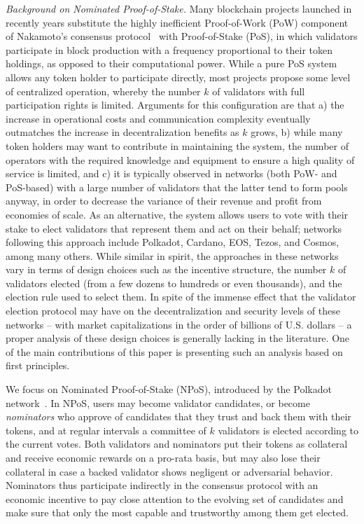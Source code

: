 \emph{Background on Nominated Proof-of-Stake.}
Many blockchain projects launched in recently years substitute the highly inefficient Proof-of-Work (PoW) component of Nakamoto's consensus protocol~\cite{nakamoto2019bitcoin} with Proof-of-Stake (PoS), in which validators participate in block production with a frequency proportional to their token holdings, as opposed to their computational power. 
While a pure PoS system allows any token holder to participate directly, most projects propose some level of centralized operation, whereby the number $k$ of validators with full participation rights is limited. 
Arguments for this configuration are that a) the increase in operational costs and communication complexity eventually outmatches the increase in decentralization benefits as $k$ grows, b) while many token holders may want to contribute in maintaining the system, the number of operators with the required knowledge and equipment to ensure a high quality of service is limited, and c) it is typically observed in networks (both PoW- and PoS-based) with a large number of validators that the latter tend to form pools anyway, in order to decrease the variance of their revenue and profit from economies of scale. 
As an alternative, the system allows users to vote with their stake to elect validators that represent them and act on their behalf; networks following this approach include Polkadot, Cardano, EOS, Tezos, and Cosmos, among many others. 
%
While similar in spirit, the approaches in these networks vary in terms of design choices such as the incentive structure, the number $k$ of validators elected (from a few dozens to hundreds or even thousands), and the election rule used to select them. 
In spite of the immense effect that the validator election protocol may have on the decentralization and security levels of these networks -- with market capitalizations in the order of billions of U.S. dollars -- a proper analysis of these design choices is generally lacking in the literature. 
One of the main contributions of this paper is presenting such an analysis based on first principles.

We focus on Nominated Proof-of-Stake (NPoS), introduced by the Polkadot network~\cite{burdges2020overview}. In NPoS, users may become validator candidates, or become \emph{nominators} who approve of candidates that they trust and back them with their tokens, and at regular intervals a committee of $k$ validators is elected according to the current votes. 
Both validators and nominators put their tokens as collateral and receive economic rewards on a pro-rata basis, but may also lose their collateral in case a backed validator shows negligent or adversarial behavior. 
Nominators thus participate indirectly in the consensus protocol with an economic incentive to pay close attention to the evolving set of candidates and make sure that only the most capable and trustworthy among them get elected. 

